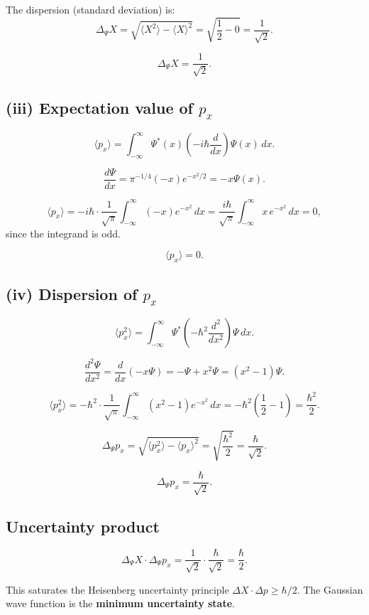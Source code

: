 \documentclass[12pt]{article}
\begin{document}
The dispersion (standard deviation) is:
\[
\Delta_\Psi X = \sqrt{\langle X^2\rangle - \langle X\rangle^2} = \sqrt{\frac{1}{2} - 0} = \frac{1}{\sqrt{2}}.
\]

\[
\boxed{\Delta_\Psi X = \frac{1}{\sqrt{2}}.}
\]

\subsection*{(iii) Expectation value of $p_x$}

\[
\langle p_x\rangle = \int_{-\infty}^{\infty}\Psi^*(x)\left(-i\hbar\frac{d}{dx}\right)\Psi(x)\,dx.
\]

\[
\frac{d\Psi}{dx} = \pi^{-1/4}(-x)e^{-x^2/2} = -x\Psi(x).
\]

\[
\langle p_x\rangle = -i\hbar\cdot\frac{1}{\sqrt{\pi}}\int_{-\infty}^{\infty}(-x)e^{-x^2}\,dx = \frac{i\hbar}{\sqrt{\pi}}\int_{-\infty}^{\infty}x\,e^{-x^2}\,dx = 0,
\]
since the integrand is odd.

\[
\boxed{\langle p_x\rangle = 0.}
\]

\subsection*{(iv) Dispersion of $p_x$}

\[
\langle p_x^2\rangle = \int_{-\infty}^{\infty}\Psi^*\left(-\hbar^2\frac{d^2}{dx^2}\right)\Psi\,dx.
\]

\[
\frac{d^2\Psi}{dx^2} = \frac{d}{dx}(-x\Psi) = -\Psi + x^2\Psi = (x^2 - 1)\Psi.
\]

\[
\langle p_x^2\rangle = -\hbar^2\cdot\frac{1}{\sqrt{\pi}}\int_{-\infty}^{\infty}(x^2-1)e^{-x^2}\,dx = -\hbar^2\left(\frac{1}{2} - 1\right) = \frac{\hbar^2}{2}.
\]

\[
\Delta_\Psi p_x = \sqrt{\langle p_x^2\rangle - \langle p_x\rangle^2} = \sqrt{\frac{\hbar^2}{2}} = \frac{\hbar}{\sqrt{2}}.
\]

\[
\boxed{\Delta_\Psi p_x = \frac{\hbar}{\sqrt{2}}.}
\]

\subsection*{Uncertainty product}

\[
\Delta_\Psi X \cdot \Delta_\Psi p_x = \frac{1}{\sqrt{2}}\cdot\frac{\hbar}{\sqrt{2}} = \frac{\hbar}{2}.
\]

This saturates the Heisenberg uncertainty principle $\Delta X\cdot\Delta p \geq \hbar/2$. The Gaussian wave function is the \textbf{minimum uncertainty state}.
\end{document}

